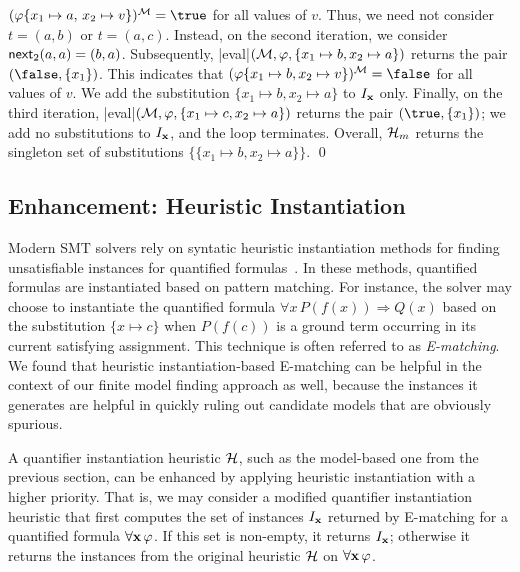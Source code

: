 \documentclass{svjour3}                     %
\begin{document}
\begin{example}
$(\varphi \{ x_1 \mapsto a,\, x_2 \mapsto v \})^\M = \true$ for all values of $v$.
Thus, we need not consider $t = (a,b)$ or $t = (a,c)$.
Instead, on the second iteration, we consider $\mathsf{next}_{2}(a,a) = (b, a)$.
Subsequently, 
|eval|$( \mathcal{M}, \varphi, \{ x_1 \mapsto b, x_2 \mapsto a \})$ returns the pair $(\false, \{ x_1 \} )$.
This indicates that 
$(\varphi \{ x_1 \mapsto b, x_2 \mapsto v \})^\M = \false$ for all values of $v$.
We add the substitution $\{ x_1 \mapsto b, x_2 \mapsto a \}$ to $I_{\mathbf{x}}$ only.
Finally, on the third iteration, 
|eval|$( \mathcal{M}, \varphi, \{ x_1 \mapsto c, x_2 \mapsto a \})$ returns the pair $(\true, \{ x_1 \} )$;
we add no substitutions to $I_{\mathbf{x}}$, and the loop terminates.
Overall, $\mathcal{H}_m$ returns the singleton set of substitutions $\{ \{ x_1 \mapsto b, x_2 \mapsto a \} \}$.
\qed
\end{example}

\subsection{Enhancement: Heuristic Instantiation}
\label{sec:heur-inst}

Modern SMT solvers rely on syntatic heuristic instantiation methods 
for finding unsatisfiable instances for quantified formulas~\cite{Detlefs03simplify:a,DBLP:conf/cade/MouraB07,ReynoldsTinelliMoura14}.
In these methods, quantified formulas are instantiated based on pattern matching.
For instance, the solver may choose to instantiate the quantified formula $\forall x\, P( f( x ) ) \Rightarrow Q( x )$
based on the substitution $\{ x \mapsto c \}$ when
$P( f( c ) )$ is a ground term occurring in its current satisfying assignment.
This technique is often referred to as \emph{E-matching}.
We found that heuristic instantiation-based E-matching can be helpful in the context of our finite model finding approach as well,
because the instances it generates are helpful in quickly ruling out candidate models
that are obviously spurious.

A quantifier instantiation heuristic $\mathcal{H}$, such as the model-based one from
the previous section, can be enhanced
by applying heuristic instantiation with a higher priority.
That is, we may consider a modified quantifier instantiation heuristic that 
first computes the set of instances $I_{\mathbf{x}}$ returned by
E-matching for a quantified formula $\forall \mathbf{x}\,\varphi$.
If this set is non-empty, it returns $I_{\mathbf{x}}$; otherwise it
returns the instances from the original heuristic $\mathcal{H}$ on $\forall \mathbf{x}\,\varphi$.
\end{document}
